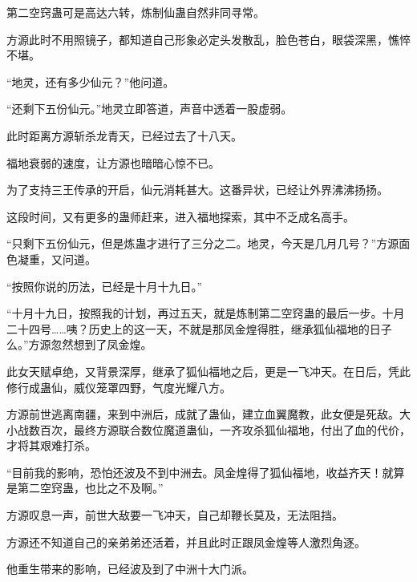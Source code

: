 \begin{this_body}
第二空窍蛊可是高达六转，炼制仙蛊自然非同寻常。

方源此时不用照镜子，都知道自己形象必定头发散乱，脸色苍白，眼袋深黑，憔悴不堪。

“地灵，还有多少仙元？”他问道。

“还剩下五份仙元。”地灵立即答道，声音中透着一股虚弱。

此时距离方源斩杀龙青天，已经过去了十八天。

福地衰弱的速度，让方源也暗暗心惊不已。

为了支持三王传承的开启，仙元消耗甚大。这番异状，已经让外界沸沸扬扬。

这段时间，又有更多的蛊师赶来，进入福地探索，其中不乏成名高手。

“只剩下五份仙元，但是炼蛊才进行了三分之二。地灵，今天是几月几号？”方源面色凝重，又问道。

“按照你说的历法，已经是十月十九日。”

“十月十九日，按照我的计划，再过五天，就是炼制第二空窍蛊的最后一步。十月二十四号……咦？历史上的这一天，不就是那凤金煌得胜，继承狐仙福地的日子么。”方源忽然想到了凤金煌。

此女天赋卓绝，又背景深厚，继承了狐仙福地之后，更是一飞冲天。在日后，凭此修行成蛊仙，威仪笼罩四野，气度光耀八方。

方源前世逃离南疆，来到中洲后，成就了蛊仙，建立血翼魔教，此女便是死敌。大小战数百次，最终方源联合数位魔道蛊仙，一齐攻杀狐仙福地，付出了血的代价，才将其艰难打杀。

“目前我的影响，恐怕还波及不到中洲去。凤金煌得了狐仙福地，收益齐天！就算是第二空窍蛊，也比之不及啊。”

方源叹息一声，前世大敌要一飞冲天，自己却鞭长莫及，无法阻挡。

方源还不知道自己的亲弟弟还活着，并且此时正跟凤金煌等人激烈角逐。

他重生带来的影响，已经波及到了中洲十大门派。

\end{this_body}


